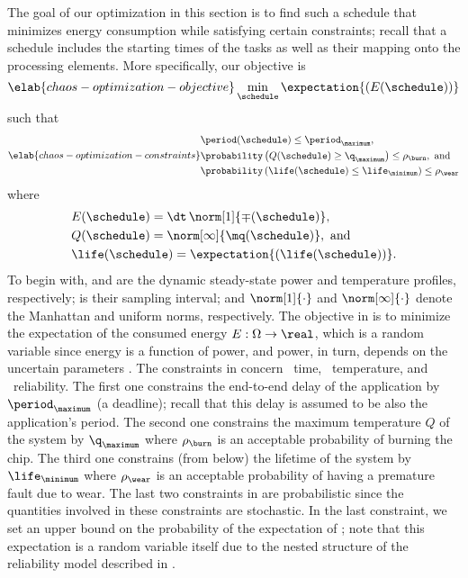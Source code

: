 The goal of our optimization in this section is to find such a schedule
\schedule that minimizes energy consumption while satisfying certain
constraints; recall that a schedule includes the starting times of the tasks as
well as their mapping onto the processing elements. More specifically, our
objective is
\begin{equation} \elab{chaos-optimization-objective}
  \min_{\schedule} \expectation{(E(\schedule))}
\end{equation}
such that
\begin{equation} \elab{chaos-optimization-constraints}
  \begin{split}
    & \period(\schedule) \leq \period_\maximum, \\
    & \probability\left(Q(\schedule) \geq \q_\maximum\right) \leq \rho_\burn, \text{ and} \\
    & \probability\left(\life(\schedule) \leq \life_\minimum\right) \leq \rho_\wear
  \end{split}
\end{equation}
where
\begin{align*}
  & E(\schedule) = \dt \, \norm[1]{\mp(\schedule)}, \\
  & Q(\schedule) = \norm[\infty]{\mq(\schedule)}, \text{ and} \\
  & \life(\schedule) = \expectation{\left(\life(\schedule)\right)}.
\end{align*}
To begin with, \mp and \mq are the dynamic steady-state power and temperature
profiles, respectively; \dt is their sampling interval; and $\norm[1]{\cdot}$
and $\norm[\infty]{\cdot}$ denote the Manhattan and uniform norms, respectively.
The objective in  is to minimize the
expectation of the consumed energy $E: \Omega \to \real$, which is a random
variable since energy is a function of power, and power, in turn, depends on the
uncertain parameters \vu. The constraints in
 concern \one~time, \two~temperature, and
\three~reliability. The first one constrains the end-to-end delay \period of the
application by $\period_\maximum$ (a deadline); recall that this delay is
assumed to be also the application's period. The second one constrains the
maximum temperature $Q$ of the system by $\q_\maximum$ where $\rho_\burn$ is an
acceptable probability of burning the chip. The third one constrains (from
below) the lifetime \life of the system by $\life_\minimum$ where $\rho_\wear$
is an acceptable probability of having a premature fault due to wear. The last
two constraints in  are probabilistic since
the quantities involved in these constraints are stochastic. In the last
constraint, we set an upper bound on the probability of the expectation of
\life; note that this expectation is a random variable itself due to the nested
structure of the reliability model described in .

